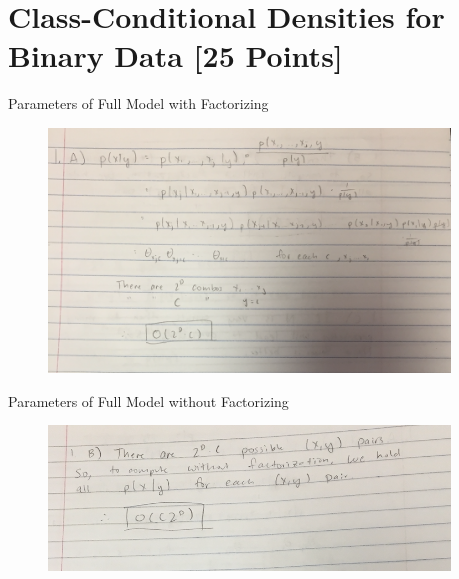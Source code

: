 \newif\ifshowsolutions
\showsolutionstrue







\pagestyle{fancy}


\section{Class-Conditional Densities for Binary Data [25 Points]}

\problem[5] Parameters of Full Model with Factorizing
\begin{subsolution}
\begin{figure}[H]
	\centering
	\includegraphics[width=0.95\textwidth]{img/set6template-58a4d205.png}
	\caption{}
	\label{}
\end{figure}
\end{subsolution}
\clearpage

\problem[5] Parameters of Full Model without Factorizing
\begin{subsolution}
\begin{figure}[H]
	\centering
	\includegraphics[width=0.95\textwidth]{img/set6template-ee5d9c5d.png}
	\caption{}
	\label{}
\end{figure}
\end{subsolution}
\clearpage

